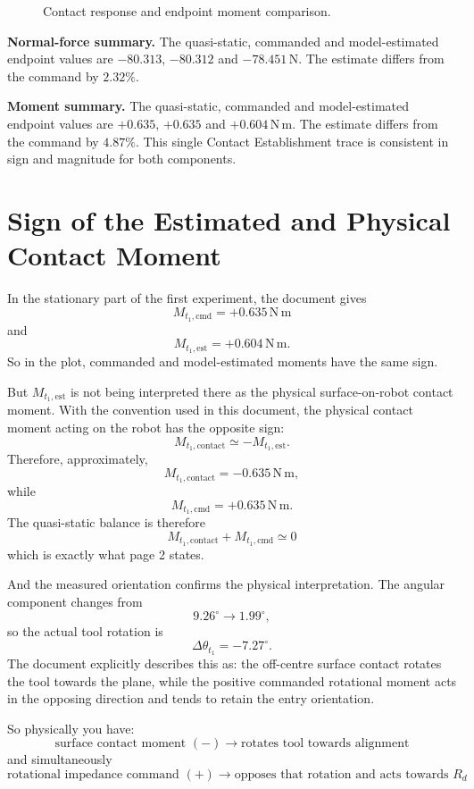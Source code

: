 \documentclass[11pt,a4paper]{article}
\begin{document}
\begin{figure}[H]
  \centering
  
  \caption{Contact response and endpoint moment comparison.}
\end{figure}

\noindent\textbf{Normal-force summary.}
The quasi-static, commanded and model-estimated endpoint values are
\(-80.313\), \(-80.312\) and \(-78.451\,\mathrm{N}\).  The estimate differs
from the command by \(2.32\%\).

\par\smallskip
\noindent\textbf{Moment summary.}
The quasi-static, commanded and model-estimated endpoint values are
\(+0.635\), \(+0.635\) and \(+0.604\,\mathrm{N\,m}\).  The estimate differs
from the command by \(4.87\%\).  This single Contact Establishment trace is
consistent in sign and magnitude for both components.
\endgroup

\clearpage
\section*{Sign of the Estimated and Physical Contact Moment}

In the stationary part of the first experiment, the document gives
\[
 M_{t_1,\mathrm{cmd}}=+0.635\,\mathrm{N\,m}
\]
and
\[
 M_{t_1,\mathrm{est}}=+0.604\,\mathrm{N\,m}.
\]
So in the plot, commanded and model-estimated moments have the same sign.

But \(M_{t_1,\mathrm{est}}\) is not being interpreted there as the physical
surface-on-robot contact moment.  With the convention used in this document,
the physical contact moment acting on the robot has the opposite sign:
\[
 M_{t_1,\mathrm{contact}}\simeq-M_{t_1,\mathrm{est}}.
\]
Therefore, approximately,
\[
 M_{t_1,\mathrm{contact}}=-0.635\,\mathrm{N\,m},
\]
while
\[
 M_{t_1,\mathrm{cmd}}=+0.635\,\mathrm{N\,m}.
\]
The quasi-static balance is therefore
\[
 \boxed{M_{t_1,\mathrm{contact}}+M_{t_1,\mathrm{cmd}}\simeq0}
\]
which is exactly what page 2 states.

And the measured orientation confirms the physical interpretation.  The angular
component changes from
\[
 9.26^\circ\rightarrow1.99^\circ,
\]
so the actual tool rotation is
\[
 \Delta\theta_{t_1}=-7.27^\circ.
\]
The document explicitly describes this as: the off-centre surface contact
rotates the tool towards the plane, while the positive commanded rotational
moment acts in the opposing direction and tends to retain the entry
orientation.

So physically you have:
\[
 \boxed{\text{surface contact moment }(-)\rightarrow
 \text{rotates tool towards alignment}}
\]
and simultaneously
\[
 \boxed{\text{rotational impedance command }(+)\rightarrow
 \text{opposes that rotation and acts towards }R_d}
\]
\end{document}

